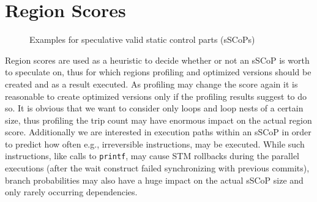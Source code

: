 




\section{Region Scores}
\label{RegionScores}
\lstset{frame=none}
\begin{figure}[h]
  \centering

  \caption{Examples for speculative valid static control parts (sSCoPs)}
  \label{fig:ScoredSCoPs}
\end{figure}
\resetlst
Region scores are used as a heuristic to decide whether or not an sSCoP is worth
to speculate on, thus for which regions profiling and optimized versions should
be created and as a result executed.
As profiling may change the score again it is reasonable to create 
optimized versions only if the profiling results suggest to do so. 
It is obvious that we want to consider only loops and loop nests of a certain size,
thus profiling the trip count may have enormous impact on the actual region score.
Additionally we are interested in execution paths within an sSCoP in order
to predict how often
e.g., irreversible instructions, may be executed. While such instructions, like
calls to \texttt{printf}, may cause STM rollbacks during the parallel executions
(after the wait construct failed synchronizing with previous commits),
branch probabilities may also have a huge impact on the actual sSCoP size and
only rarely occurring dependencies. 

